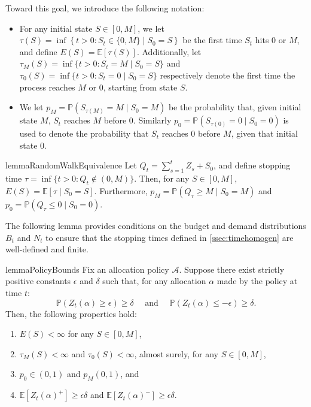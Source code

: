 \documentclass[10pt,a4paper]{amsart}
\theoremstyle{plain}
\theoremstyle{definition}
\theoremstyle{remark}
\newcommand{\E}{\mathbb{E}}
\newcommand{\pr}{\mathbb{P}}
\renewcommand{\Pr}{\pr}
\newcommand{\Exp}[1]{\mathbb{E} \left[ #1 \right]}
\begin{document}
Toward this goal, we introduce the following notation:
\begin{itemize}
    \item For any initial state $S \in [0, M]$, we let $\tau(S) = \inf\left\{t > 0 : S_{t} \in \{0, M\} \mid S_0 = S \right\}$ be the first time $S_t$ hits $0$ or $M$, and define $E(S) = \mathbb{E}[\tau(S)]$. Additionally, let {$\tau_M(S) = \inf\{t > 0 : S_t = M \mid S_0 = S\}$ and $\tau_0(S) = \inf\{t > 0 : S_t = 0 \mid S_0 = S\}$ respectively denote the first time the process reaches $M$ or $0$, starting from state $S$.}
    \item We let $p_M = \pr(S_{\tau(M)} = M \mid S_0 = M)$ be the probability that, given initial state $M$, $S_t$ reaches $M$ before 0. Similarly  $p_0 = \pr(S_{\tau(0)} = 0 \mid S_0 = 0)$ is used to denote the probability that $S_t$ reaches 0 before $M$, given that initial state 0.
\end{itemize}

\begin{restatable}{lemma}{RandomWalkEquivalence}
\label{lem:Random_walk_equivalence_1}
Let $Q_t = \sum_{s=1}^t Z_s + S_0$, and define stopping time \mbox{$\tau = \inf\{t > 0: Q_t \not\in (0, M)\}$}. Then, for any $S \in [0, M]$, $E(S) = \E[\tau \mid S_0 = S]$. Furthermore, \mbox{$p_M = \pr(Q_{\tau} \geq M \mid S_0 = M)$} and $p_0 = \pr(Q_{\tau} \leq 0 \mid S_0 = 0)$.
\end{restatable}

The following lemma provides conditions on the budget and demand distributions $B_t$ and $N_t$ to ensure that the stopping times defined in \cref{ssec:timehomogen} are well-defined and finite.

\begin{restatable}{lemma}{PolicyBounds}
    \label{lem:policy_constants}
    Fix an allocation policy $\mathcal{A}$.  Suppose there exist strictly positive constants $\epsilon$ and $\delta$ such that, for any allocation $\alpha$ made by the policy at time $t$:
    \[
    \Pr(Z_t(\alpha) \geq \epsilon) \geq \delta \quad \text{ and } \quad \Pr(Z_t(\alpha) \leq - \epsilon) \geq \delta.
    \]
    Then, the following properties hold:
    \begin{enumerate}[label=(\roman*)]
    \item  $E(S) < \infty$ for any $S \in [0,M]$,
    \item $\tau_M(S) < \infty$ and $\tau_0(S) < \infty$, almost surely, for any $S \in [0,M]$,
    \item $p_0 \in (0,1)$ and $p_M (0,1)$, and
    \item $\Exp{Z_t(\alpha)^+} \geq \epsilon \delta$ and $\Exp{Z_t(\alpha)^-} \geq \epsilon \delta$.
    \end{enumerate}
\end{restatable}
\end{document}
